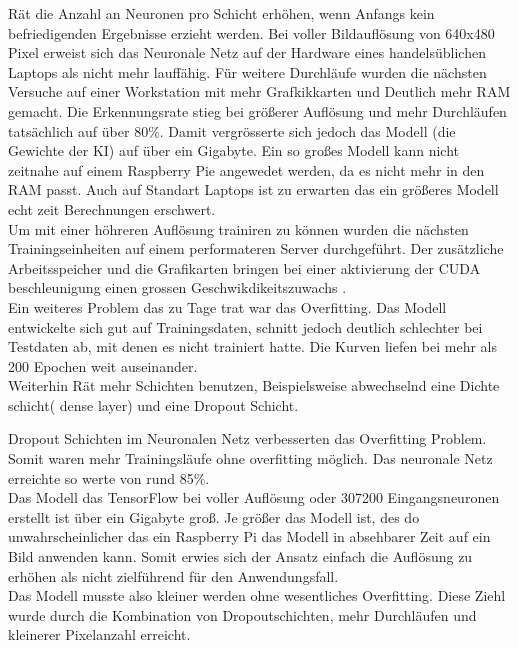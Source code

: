 \documentclass[conference]{IEEEtran}
\begin{document}
	\cite{moolayil2019learn} Rät die Anzahl an Neuronen pro Schicht erhöhen, wenn Anfangs kein befriedigenden Ergebnisse erzieht werden.
	Bei voller Bildauflösung von 640x480 Pixel erweist sich das Neuronale Netz auf der Hardware eines handelsüblichen Laptops als nicht mehr lauffähig. Für weitere Durchläufe wurden die nächsten Versuche auf einer Workstation mit mehr Grafkikkarten und Deutlich mehr RAM gemacht. Die Erkennungsrate stieg bei größerer Auflösung und mehr Durchläufen tatsächlich auf über 80\%. Damit vergrösserte sich jedoch das Modell (die Gewichte der KI) auf über ein Gigabyte. Ein so großes Modell kann nicht zeitnahe auf einem Raspberry Pie angewedet werden, da es nicht mehr in den RAM passt. Auch auf Standart Laptops ist zu erwarten das ein größeres Modell echt zeit Berechnungen erschwert. \\
	
	
	Um mit einer höhreren Auflösung trainiren zu können wurden die nächsten Trainingseinheiten auf einem performateren Server durchgeführt. Der zusätzliche Arbeitsspeicher und die Grafikarten bringen bei einer aktivierung der CUDA beschleunigung einen grossen Geschwikdikeitszuwachs . \\
	
	Ein weiteres Problem das zu Tage trat war das Overfitting. Das Modell entwickelte sich gut auf Trainingsdaten, schnitt jedoch deutlich schlechter bei Testdaten ab, mit denen es nicht trainiert hatte. Die Kurven liefen bei mehr als 200 Epochen weit auseinander.\\
	
	
	Weiterhin Rät \cite{moolayil2019learn} mehr Schichten benutzen, Beispielsweise abwechselnd eine Dichte schicht( dense layer) und eine Dropout Schicht.
	
	Dropout Schichten im Neuronalen Netz verbesserten das Overfitting Problem. Somit waren mehr Trainingsläufe ohne overfitting möglich. Das neuronale Netz erreichte so werte von rund 85\%. \\
	
	Das Modell das TensorFlow bei voller Auflösung oder 307200 Eingangsneuronen erstellt ist über ein Gigabyte groß. Je größer das Modell ist, des do unwahrscheinlicher das ein Raspberry Pi das Modell in absehbarer Zeit auf ein Bild anwenden kann. Somit erwies sich der Ansatz einfach die Auflösung zu erhöhen als nicht  zielführend für den Anwendungsfall. \\
	
	Das Modell musste also kleiner werden ohne wesentliches Overfitting. Diese Ziehl wurde durch die Kombination von Dropoutschichten, mehr Durchläufen und kleinerer Pixelanzahl erreicht. \\
	
\end{document}
